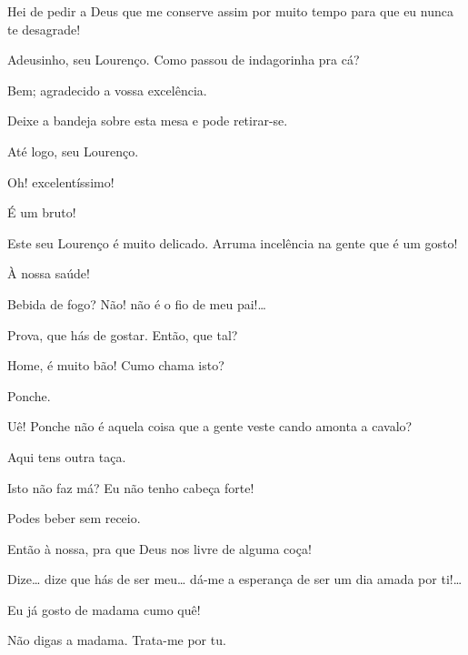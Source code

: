  Hei de pedir a Deus que me conserve assim por muito tempo para que
eu nunca te desagrade! 


 Adeusinho, seu Lourenço. Como passou de indagorinha pra cá?

  Bem; agradecido a vossa
excelência.

 Deixe a bandeja sobre esta mesa e pode retirar-se. 

 Até logo, seu Lourenço. 

 Oh! excelentíssimo! 

  É um bruto!


 Este seu Lourenço é muito delicado. Arruma incelência na gente
que é um gosto!

  À nossa saúde!

 Bebida de fogo? Não! não é o fio de meu pai!\ldots{}

 Prova, que hás de gostar.  Então, que tal? 

 Home, é muito bão! Cumo chama isto?

 Ponche.

 Uê! Ponche não é aquela coisa que a gente veste cando amonta a
cavalo?

 Aqui tens outra taça.

 Isto não faz má? Eu não tenho cabeça forte!

 Podes beber sem receio.

 Então à nossa, pra que Deus nos livre de alguma coça! 

 Dize\ldots{} dize que hás de ser meu\ldots{} dá-me a esperança de ser um dia
amada por ti!\ldots{}

 Eu já gosto de madama cumo quê!

 Não digas a madama. Trata-me por tu.

